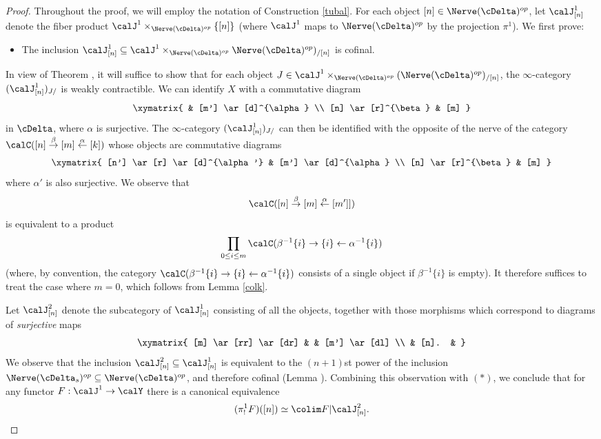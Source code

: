 \begin{proof}
Throughout the proof, we will employ the notation of Construction \ref{tubal}.
For each object $[n] \in \Nerve(\cDelta)^{op}$, let $\calJ^1_{[n]}$ denote the fiber
product $\calJ^1 \times_{ \Nerve(\cDelta)^{op} } \{ [n] \}$ (where
$\calJ^{1}$ maps to $\Nerve(\cDelta)^{op}$ by the projection $\pi^{1}$). 
We first prove:
\begin{itemize}
\item[$(\ast)$] The inclusion $\calJ^{1}_{[n]} \subseteq \calJ^{1} \times_{ \Nerve(\cDelta)^{op}}  \Nerve(\cDelta)^{op})_{/[n]}$ is cofinal. 
\end{itemize}
In view of Theorem , it will suffice to show that for each object
$J \in \calJ^{1} \times_{ \Nerve(\cDelta)^{op} } (\Nerve( \cDelta)^{op})_{/[n]}$, the
$\infty$-category $( \calJ^{1}_{[n]})_{J/}$ is weakly contractible. We can identify
$X$ with a commutative diagram 
$$ \xymatrix{ & [m'] \ar[d]^{\alpha} \\
[n] \ar[r]^{\beta} & [m] }$$
in $\cDelta$, where $\alpha$ is surjective. The $\infty$-category
$(\calJ^{1}_{[n]})_{J/}$ can then be identified with the opposite of the nerve
of the category $\calC( [n] \stackrel{\beta}{\rightarrow} [m] \stackrel{\alpha}{\leftarrow} [k])$ whose objects are commutative diagrams
$$ \xymatrix{ [n'] \ar[r] \ar[d]^{\alpha'} & [m'] \ar[d]^{\alpha} \\
[n] \ar[r]^{\beta} & [m] }$$
where $\alpha'$ is also surjective. We observe that
$$\calC( [n] \stackrel{\beta}{\rightarrow} [m] \stackrel{\alpha}{\leftarrow} [m']])$$
is equivalent to a product $$\prod_{ 0 \leq i \leq m} \calC( \beta^{-1} \{i\} \rightarrow \{i\}  \leftarrow \alpha^{-1} \{i\})$$ (where, by convention, the category $\calC( \beta^{-1} \{i\} \rightarrow \{i\}  \leftarrow \alpha^{-1} \{i\})$ consists of a single object if $\beta^{-1} \{i\}$ is empty).
It therefore suffices to treat the case where $m=0$, which follows from
Lemma \ref{colk}.

Let $\calJ^{2}_{[n]}$ denote the subcategory of $\calJ^{1}_{[n]}$ consisting of all the objects, together with those morphisms which correspond to diagrams of {\em surjective} maps
$$ \xymatrix{ [m] \ar[rr] \ar[dr] & & [m'] \ar[dl] \\
& [n]. & }$$
We observe that the inclusion $\calJ^{2}_{[n]} \subseteq \calJ^{1}_{[n]}$ is equivalent
to the $(n+1)$st power of the inclusion $\Nerve(\cDelta_{s})^{op} \subseteq \Nerve(\cDelta)^{op}$, and
therefore cofinal (Lemma ). Combining this observation with $(\ast)$, we conclude that for any functor $F: \calJ^1 \rightarrow \calY$ there is a canonical equivalence
$$(\pi^1_{!} F)([n]) \simeq \colim F | \calJ^2_{[n]}.$$


\end{proof}
